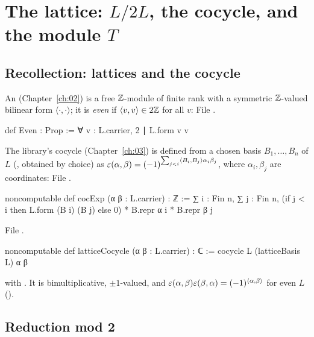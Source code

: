 \section{The lattice: \texorpdfstring{$L/2L$}{L/2L}, the cocycle, and the module \texorpdfstring{$T$}{T}}\label{ch06:sec:lattice}

\subsection{Recollection: lattices and the cocycle}

An  (Chapter~\ref{ch:02}) is a free ${\mathbb{Z}}$-module of finite rank with a
symmetric ${\mathbb{Z}}$-valued bilinear form $\langle\cdot,\cdot\rangle$; it is \emph{even} if
$\langle v,v\rangle\in2{\mathbb{Z}}$ for all $v$:
\noindent File .
\begin{leancode}
def Even : Prop := ∀ v : L.carrier, 2 ∣ L.form v v
\end{leancode}
The library's cocycle (Chapter~\ref{ch:03}) is defined from a chosen basis $B_1,\dots,B_n$ of $L$
(, obtained by choice) as
$\varepsilon(\alpha,\beta)=(-1)^{\sum_{j<i}\langle B_i,B_j\rangle\alpha_i\beta_j}$, where
$\alpha_i,\beta_j$ are coordinates:
\noindent File .
\begin{leancode}
noncomputable def cocExp (α β : L.carrier) : ℤ :=
  ∑ i : Fin n, ∑ j : Fin n,
    (if j < i then L.form (B i) (B j) else 0) * B.repr α i * B.repr β j
\end{leancode}
\noindent File .
\begin{leancode}
noncomputable def latticeCocycle (α β : L.carrier) : ℂ := cocycle L (latticeBasis L) α β
\end{leancode}
with .  It is bimultiplicative, $\pm1$-valued,
and $\varepsilon(\alpha,\beta)\varepsilon(\beta,\alpha)=(-1)^{\langle\alpha,\beta\rangle}$ for even $L$
().

\subsection{Reduction mod 2}

